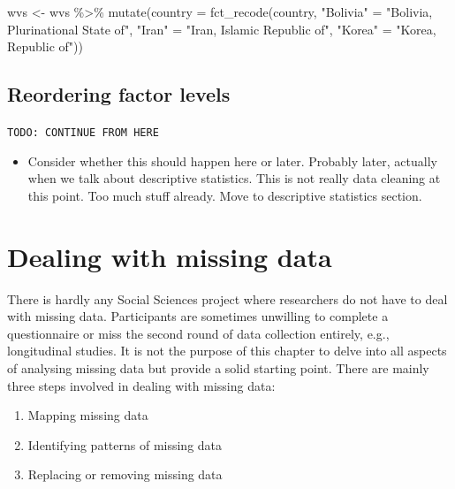 \documentclass[
]{book}
\newenvironment{Shaded}{\begin{snugshade}}{\end{snugshade}}
\newcommand{\AttributeTok}[1]{\textcolor[rgb]{0.77,0.63,0.00}{#1}}
\newcommand{\FunctionTok}[1]{\textcolor[rgb]{0.00,0.00,0.00}{#1}}
\newcommand{\NormalTok}[1]{#1}
\newcommand{\OtherTok}[1]{\textcolor[rgb]{0.56,0.35,0.01}{#1}}
\newcommand{\SpecialCharTok}[1]{\textcolor[rgb]{0.00,0.00,0.00}{#1}}
\newcommand{\StringTok}[1]{\textcolor[rgb]{0.31,0.60,0.02}{#1}}
\providecommand{\tightlist}{%
  \setlength{\itemsep}{0pt}\setlength{\parskip}{0pt}}
\begin{document}
\begin{Shaded}
\begin{Highlighting}[]
\NormalTok{wvs }\OtherTok{\textless{}{-}}\NormalTok{ wvs }\SpecialCharTok{\%\textgreater{}\%}
  \FunctionTok{mutate}\NormalTok{(}\AttributeTok{country =} \FunctionTok{fct\_recode}\NormalTok{(country,}
                                   \StringTok{"Bolivia"} \OtherTok{=} \StringTok{"Bolivia, Plurinational State of"}\NormalTok{,}
                                   \StringTok{"Iran"} \OtherTok{=} \StringTok{"Iran, Islamic Republic of"}\NormalTok{,}
                                   \StringTok{"Korea"} \OtherTok{=} \StringTok{"Korea, Republic of"}\NormalTok{))}
\end{Highlighting}
\end{Shaded}

\hypertarget{reordering-factor-levels}{%
\subsection{Reordering factor levels}\label{reordering-factor-levels}}

\texttt{TODO:\ CONTINUE\ FROM\ HERE}

\begin{itemize}
\tightlist
\item
  Consider whether this should happen here or later. Probably later, actually when we talk about descriptive statistics. This is not really data cleaning at this point. Too much stuff already. Move to descriptive statistics section.
\end{itemize}

\hypertarget{dealing-with-missing-data}{%
\section{Dealing with missing data}\label{dealing-with-missing-data}}

There is hardly any Social Sciences project where researchers do not have to deal with missing data. Participants are sometimes unwilling to complete a questionnaire or miss the second round of data collection entirely, e.g., longitudinal studies. It is not the purpose of this chapter to delve into all aspects of analysing missing data but provide a solid starting point. There are mainly three steps involved in dealing with missing data:

\begin{enumerate}
\def\labelenumi{\arabic{enumi}.}
\item
  Mapping missing data
\item
  Identifying patterns of missing data
\item
  Replacing or removing missing data
\end{enumerate}
\end{document}
